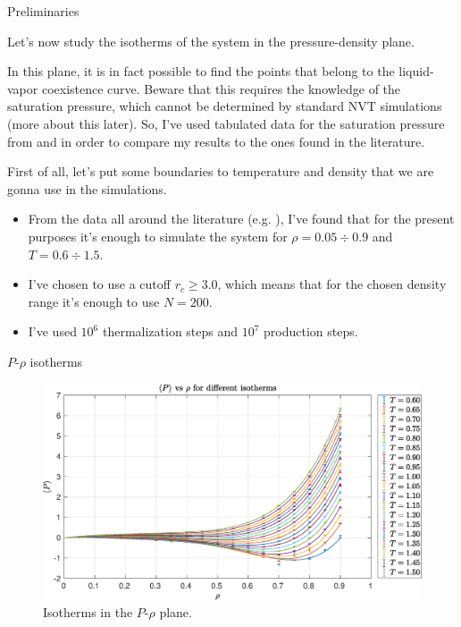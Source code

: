 \documentclass[10pt, compress, protectframetitle, handout]{beamer}
\begin{document}
\begin{frame}[allowframebreaks]{Preliminaries}

	Let's now study the isotherms of the system in the pressure-density plane.
	
	In this plane, it is in fact possible to find the points that belong to the \alert{liquid-vapor coexistence curve}. Beware that this requires the knowledge of the saturation pressure, which cannot be determined by standard NVT simulations (more about this later). So, I've used tabulated data for the saturation pressure from \cite{Johnson1993} and \cite{Siderius2012} in order to compare my results to the ones found in the literature.
	
	First of all, let's put some boundaries to temperature and density that we are gonna use in the simulations.
	\begin{itemize}
		\item From the data all around the literature (e.g. \cite{Johnson1993}), I've found that for the present purposes it's enough to simulate the system for $\rho = 0.05 \div 0.9$ and $T = 0.6 \div 1.5$.
		\item I've chosen to use a cutoff $r_c \geq 3.0$, which means that for the chosen density range it's enough to use $N=200$.
		\item I've used $10^6$ thermalization steps and $10^7$ production steps.
	\end{itemize}
	

\end{frame}

\begin{frame}{$P$-$\rho$ isotherms}

	\begin{figure}
		\centering
		\includegraphics[width=\textwidth]{PvsRho}
		\caption{Isotherms in the $P$-$\rho$ plane.}
		\label{fig:P_vs_Rho}
	\end{figure}

\end{frame}
\end{document}

